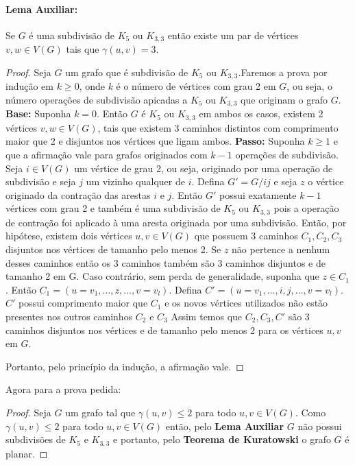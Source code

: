 \documentclass[11pt,a4paper,notitlepage]{exam}
\begin{document}
    \paragraph{Lema Auxiliar: }Se $G$ é uma subdivisão de $K_5$ ou $K_{3,3}$ então existe um par
    de vértices $v, w \in V(G)$ tais que $\gamma(u,v) = 3$.
    \begin{proof}
        Seja $G$ um grafo que é subdivisão de $K_5$ ou $K_{3,3}$.Faremos a prova por indução em $k \geq 0$, onde $k$ é o número
        de vértices com grau 2 em $G$, ou seja, o número  operações de
        subdivisão apicadas a $K_5$ ou $K_{3,3}$ que originam o grafo $G$.\newline
        \textbf{Base:} Suponha $k = 0$. Então $G$ é $K_5$ ou $K_{3,3}$
        em ambos os casos, existem 2 vértices $v,w\in V(G)$, tais que
        existem 3 caminhos distintos com comprimento maior que 2 e disjuntos nos vértices que ligam
        ambos.\newline
        \textbf{Passo:} Suponha $k\geq 1$ e que a afirmação vale
        para grafos originados com $k-1$ operações de subdivisão.
        Seja $i \in V(G)$ um vértice de grau 2, ou seja,
        originado por uma operação de subdivisão e seja $j$ um vizinho
        qualquer de $i$. Defina $G'=G/ij$ e seja $z$ o vértice
        originado da contração das arestas $i$ e $j$. Então $G'$ possui
        exatamente $k-1$ vértices com grau 2 e também é uma
        subdivisão de $K_5$ ou $K_{3,3}$ pois a operação de
        contração foi aplicado à uma aresta originada por uma
        subdivisão. Então, por hipótese, existem dois vértices $u,v \in
        V(G)$ que possuem 3 caminhos $C_1, C_2, C_3$ disjuntos nos vértices de
        tamanho pelo menos 2.\newline
        Se $z$ não pertence a nenhum desses caminhos então os 3 caminhos
        também são 3 caminhos disjuntos e de tamanho 2 em G.\newline
        Caso contrário, sem perda de generalidade, suponha que
        $z\in C_1$. Então $C_1 = (u = v_1, \dots, z, \dots, v = v_l)$.
        Defina $C' = (u = v_1, \dots, i, j, \dots, v = v_l) $.$C'$
        possui comprimento maior que $C_1$ e os novos vértices
        utilizados não estão presentes nos outros caminhos $C_2$ e $C_3$ Assim
        temos que $C_2, C_3, C'$ são 3 caminhos disjuntos nos vértices e
        de tamanho pelo menos 2 para os vértices $u,v$ em $G$.\par
        Portanto, pelo princípio da indução, a afirmação vale.
    \end{proof}

    Agora para a prova pedida:

    \begin{proof}
        Seja $G$ um grafo tal que $\gamma(u,v) \leq 2$ para todo $u,v
        \in V(G)$. Como $\gamma(u,v) \leq 2$ para todo $u,v \in V(G)$
        então, pelo \textbf{Lema Auxiliar} $G$ não possui subdivisões de
        $K_5$ e $K_{3,3}$ e portanto, pelo \textbf{Teorema de
        Kuratowski} o grafo $G$ é planar.
    \end{proof}
\end{document}
